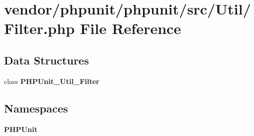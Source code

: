 \section{vendor/phpunit/phpunit/src/\+Util/\+Filter.php File Reference}
\label{phpunit_2src_2_util_2_filter_8php}
\subsection*{Data Structures}
\begin{DoxyCompactItemize}
\item 
class {\bf P\+H\+P\+Unit\+\_\+\+Util\+\_\+\+Filter}
\end{DoxyCompactItemize}
\subsection*{Namespaces}
\begin{DoxyCompactItemize}
\item 
 {\bf P\+H\+P\+Unit}
\end{DoxyCompactItemize}
